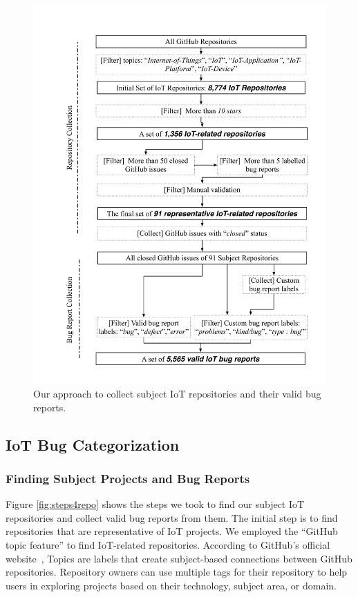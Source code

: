  \begin{figure}
  \centering
   \includegraphics[width=\linewidth]{imgs/steps4repo.pdf}
  \caption{Our approach to collect subject IoT repositories and their valid bug reports.}
  \label{fig:steps4repo}
\end{figure}

\subsection{IoT Bug Categorization}
\subsubsection{Finding Subject Projects and Bug Reports} \label{bugCollection}

Figure \autoref{fig:steps4repo} shows the steps we took to find our subject IoT repositories and collect valid bug reports from them. The initial step is to find repositories that are representative of IoT projects. We employed the ``GitHub topic feature'' to find IoT-related repositories. According to GitHub's official website~\cite{gitTopic}, Topics are labels that create subject-based connections between GitHub repositories. Repository owners can use multiple tags for their repository to help users in exploring projects based on their technology, subject area, or domain.

